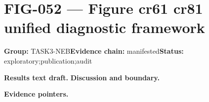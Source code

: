 \clearpage
\section{FIG-052 --- Figure cr61 cr81 unified diagnostic framework}
\label{figpage:fig-052}
\textbf{Group:} TASK3-NEB\quad \textbf{Evidence chain:} manifested\quad \textbf{Status:} exploratory;publication;audit

\textbf{Results text draft.} 
\textbf{Discussion and boundary.} 


\textbf{Evidence pointers.}



\vfill
